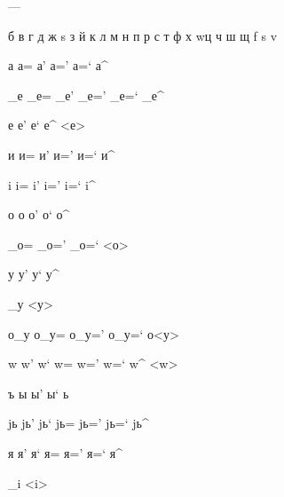 \documentclass{article}
\begin{document}
\huge
---


б в г д ж s з й к л м н п р с т ф х w\т ц ч ш щ f s v

а а= а' а=' а=` а^

_е _е= _е' _е=' _е=` _е^

е е' е` е^ <е>

и и= и' и=' и=` и^

i i= i' i=' i=` i^ 

о о о' о` о^

_о= _о=' _о=` <о>

у у' у` у^

_у <у>

о_у о_у= о_у=' о_у=` о<у>

w w' w` w= w=' w=` w^ <w>

ъ ы ы' ы` ь

jь jь' jь` jь= jь=' jь=` jь^

я я' я` я= я=' я=` я^

_i <i>
\end{document}
